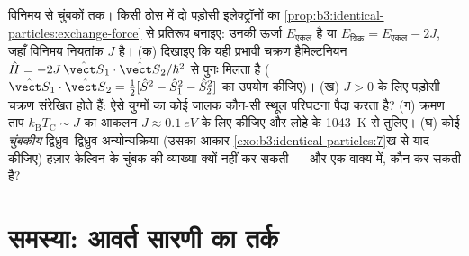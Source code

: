 \begin{exercise}[$\star\star\star$]\label{exo:b3:identical-particles:12}
विनिमय से चुंबकों तक। किसी ठोस में दो पड़ोसी इलेक्ट्रॉनों का
\cref{prop:b3:identical-particles:exchange-force} से प्रतिरूप बनाइए:
उनकी ऊर्जा $E_{\text{एकल}}$ है या $E_{\text{त्रिक}} =
E_{\text{एकल}} - 2J$, जहाँ विनिमय नियतांक $J$ है। (क) दिखाइए कि यही
प्रभावी चक्रण हैमिल्टनियन $\hat H =
-2J\,\hat{\vect S}_1\cdot\hat{\vect S}_2/\hbar^2$ से पुनः मिलता है
($\hat{\vect S}_1\cdot\hat{\vect S}_2 = \tfrac12[\hat S^2 - \hat
S_1^2 - \hat S_2^2]$ का उपयोग कीजिए)। (ख) $J > 0$ के लिए पड़ोसी चक्रण
संरेखित होते हैं: ऐसे युग्मों का कोई जालक कौन-सी स्थूल परिघटना पैदा
करता है? (ग) क्रमण ताप $k_{\text{B}}T_{\text{C}}
\sim J$ का आकलन $J \approx \qty{0.1}{eV}$ के लिए कीजिए और लोहे के
\qty{1043}{K} से तुलिए। (घ) कोई \emph{चुंबकीय} द्विध्रुव--द्विध्रुव
अन्योन्यक्रिया (उसका आकार
\cref{exo:b3:identical-particles:7}ख से याद कीजिए) हज़ार-केल्विन के
चुंबक की व्याख्या क्यों नहीं कर सकती --- और एक वाक्य में, कौन कर
सकती है?
\end{exercise}

\section{समस्या: आवर्त सारणी का तर्क}

